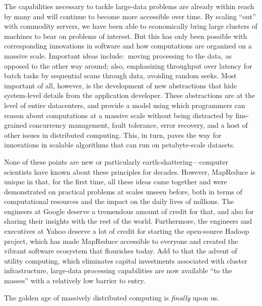 The capabilities necessary to tackle large-data problems are already
within reach by many and will continue to become more accessible over
time.  By scaling ``out'' with commodity servers, we have been able to
economically bring large clusters of machines to bear on problems of
interest.  But this has only been possible with corresponding
innovations in software and how computations are organized on a
massive scale.  Important ideas include:\ moving processing to the
data, as opposed to the other way around; also, emphasizing throughput
over latency for batch tasks by sequential scans through data,
avoiding random seeks.  Most important of all, however, is the
development of new abstractions that hide system-level details from
the application developer.  These abstractions are at the level of
entire datacenters, and provide a model using which programmers can
reason about computations at a massive scale without being distracted
by fine-grained concurrency management, fault tolerance, error
recovery, and a host of other issues in distributed computing.  This,
in turn, paves the way for innovations in scalable algorithms that can
run on petabyte-scale datasets.

None of these points are new or particularly
earth-shattering---computer scientists have known about these
principles for decades.  However, MapReduce is unique in that, for the
first time, all these ideas came together and were demonstrated on
practical problems at scales unseen before, both in terms of
computational resources and the impact on the daily lives of millions.
The engineers at Google deserve a tremendous amount of credit for
that, and also for sharing their insights with the rest of the world.
Furthermore, the engineers and executives at Yahoo deserve a lot of
credit for starting the open-source Hadoop project, which has made
MapReduce accessible to everyone and created the vibrant software
ecosystem that flourishes today.  Add to that the advent of utility
computing, which eliminates capital investments associated with
cluster infrastructure, large-data processing capabilities are now
available ``to the masses'' with a relatively low barrier to entry.

The golden age of massively distributed computing is \emph{finally}
upon us.

